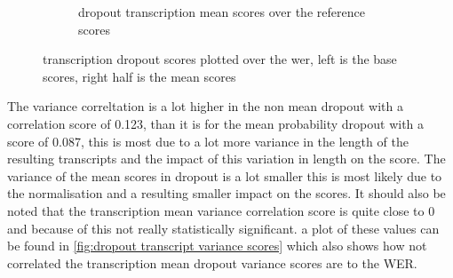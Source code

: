 \begin{figure}[ht]
\begin{subfigure}{0.4\linewidth}
        \caption{dropout transcription mean scores over the reference scores}
    \end{subfigure}
    \caption{transcription dropout scores plotted over the wer, left is the base scores, right half is the mean scores}
    \label{fig:dropout transcript scores}
    \end{figure}
    
The variance correltation is a lot higher in the non mean dropout with a correlation score of 0.123, than it is for the mean probability dropout with a score of 0.087, this is most due to a lot more variance in the length of the resulting transcripts and the impact of this variation in length on the score. The variance of the mean scores in dropout is a lot smaller this is most likely due to the normalisation and a resulting smaller impact on the scores. It should also be noted that the transcription mean variance correlation score is quite close to 0 and because of this not really statistically significant. a plot of these values can be found in \autoref{fig:dropout transcript variance scores} which also shows how not correlated the transcription mean dropout variance scores are to the WER. 
